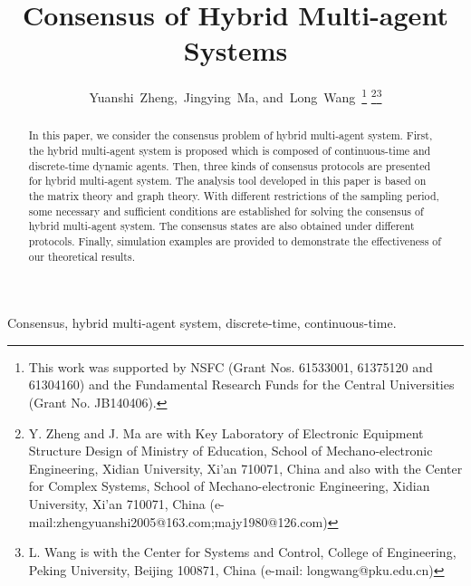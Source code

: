 \documentclass[12pt,draftcls,onecolumn]{IEEEtran}
\begin{document}
\title{Consensus of Hybrid Multi-agent Systems}

\author{Yuanshi~Zheng,~Jingying~Ma,
       and~Long~Wang~\thanks{This work was supported by NSFC (Grant Nos. 61533001, 61375120 and 61304160) and the Fundamental Research Funds for the Central Universities (Grant No. JB140406).}
\thanks{Y. Zheng and J. Ma are with Key Laboratory of Electronic Equipment Structure Design of Ministry of Education, School of Mechano-electronic Engineering, Xidian University, Xi'an 710071, China and also with the Center for Complex Systems, School of Mechano-electronic Engineering, Xidian University, Xi'an 710071, China
 (e-mail:zhengyuanshi2005@163.com;majy1980@126.com)
}\thanks{L. Wang is with the Center for Systems and Control, College of Engineering, Peking
University, Beijing 100871, China
 (e-mail: longwang@pku.edu.cn)}
}
















\maketitle


\begin{abstract}
In this paper, we consider the consensus problem of hybrid multi-agent system. First, the hybrid multi-agent system is proposed which is composed of continuous-time and discrete-time dynamic agents. Then, three kinds of consensus protocols are presented for hybrid multi-agent system. The analysis tool developed in this paper is based on the matrix theory and graph theory. With different restrictions of the sampling period, some necessary and sufficient conditions are established for solving the consensus of hybrid multi-agent system. The consensus states are also obtained under different protocols. Finally, simulation examples are provided to demonstrate the effectiveness of our theoretical results.
\end{abstract}

\begin{keywords}
Consensus, hybrid multi-agent system, discrete-time, continuous-time.
\end{keywords}






\IEEEpeerreviewmaketitle
\end{document}
